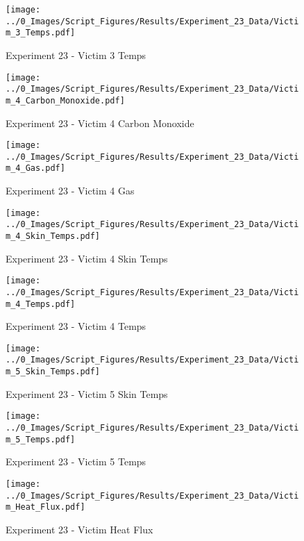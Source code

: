 	\clearpage

	\begin{figure}[H]
		\centering
		\texttt{[image: ../0\_Images/Script\_Figures/Results/Experiment\_23\_Data/Victim\_3\_Temps.pdf]}
		\caption[]{Experiment 23 - Victim 3 Temps}
	\end{figure}
 

	\begin{figure}[H]
		\centering
		\texttt{[image: ../0\_Images/Script\_Figures/Results/Experiment\_23\_Data/Victim\_4\_Carbon\_Monoxide.pdf]}
		\caption[]{Experiment 23 - Victim 4 Carbon Monoxide}
	\end{figure}
 
	\clearpage

	\begin{figure}[H]
		\centering
		\texttt{[image: ../0\_Images/Script\_Figures/Results/Experiment\_23\_Data/Victim\_4\_Gas.pdf]}
		\caption[]{Experiment 23 - Victim 4 Gas}
	\end{figure}
 

	\begin{figure}[H]
		\centering
		\texttt{[image: ../0\_Images/Script\_Figures/Results/Experiment\_23\_Data/Victim\_4\_Skin\_Temps.pdf]}
		\caption[]{Experiment 23 - Victim 4 Skin Temps}
	\end{figure}
 
	\clearpage

	\begin{figure}[H]
		\centering
		\texttt{[image: ../0\_Images/Script\_Figures/Results/Experiment\_23\_Data/Victim\_4\_Temps.pdf]}
		\caption[]{Experiment 23 - Victim 4 Temps}
	\end{figure}
 

	\begin{figure}[H]
		\centering
		\texttt{[image: ../0\_Images/Script\_Figures/Results/Experiment\_23\_Data/Victim\_5\_Skin\_Temps.pdf]}
		\caption[]{Experiment 23 - Victim 5 Skin Temps}
	\end{figure}
 
	\clearpage

	\begin{figure}[H]
		\centering
		\texttt{[image: ../0\_Images/Script\_Figures/Results/Experiment\_23\_Data/Victim\_5\_Temps.pdf]}
		\caption[]{Experiment 23 - Victim 5 Temps}
	\end{figure}
 

	\begin{figure}[H]
		\centering
		\texttt{[image: ../0\_Images/Script\_Figures/Results/Experiment\_23\_Data/Victim\_Heat\_Flux.pdf]}
		\caption[]{Experiment 23 - Victim Heat Flux}
	\end{figure}
 
